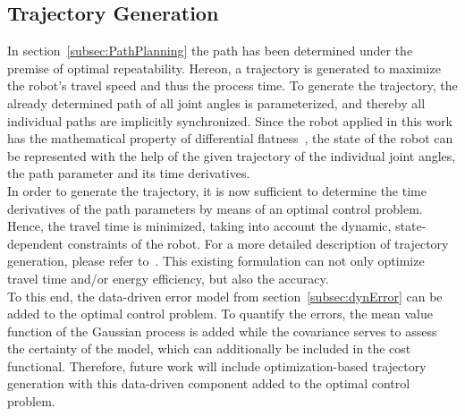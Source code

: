 \documentclass[5p,times,procedia]{elsarticle}
\begin{document}
\subsection{Trajectory Generation}
In section~\ref{subsec:PathPlanning} the path has been determined under the premise of optimal repeatability. Hereon, a trajectory is generated to maximize the robot’s travel speed and thus the process time.
To generate the trajectory, the already determined path of all joint angles is parameterized, and thereby all individual paths are implicitly synchronized.
Since the robot applied in this work has the mathematical property of differential flatness~\cite{Hoffmann23}, the state of the robot can be represented with the help of the given trajectory of the individual joint angles, the path parameter and its time derivatives.\\
In order to generate the trajectory, it is now sufficient to determine the time derivatives of the path parameters by means of an optimal control problem. 
Hence, the travel time is minimized, taking into account the dynamic, state-dependent constraints of the robot. For a more detailed description of trajectory generation, please refer to~\cite{Kanagalingam24}.
%
This existing formulation can not only optimize travel time and/or energy efficiency, but also the accuracy.\\
To this end, the data-driven error model from section~\ref{subsec:dynError} can be added to the optimal control problem.
To quantify the errors, the mean value function of the Gaussian process is added while the covariance serves to assess the certainty of the model, which can additionally be included in the cost functional. Therefore, future work will include optimization-based trajectory generation with this data-driven component added to the optimal control problem.
%
\end{document}
